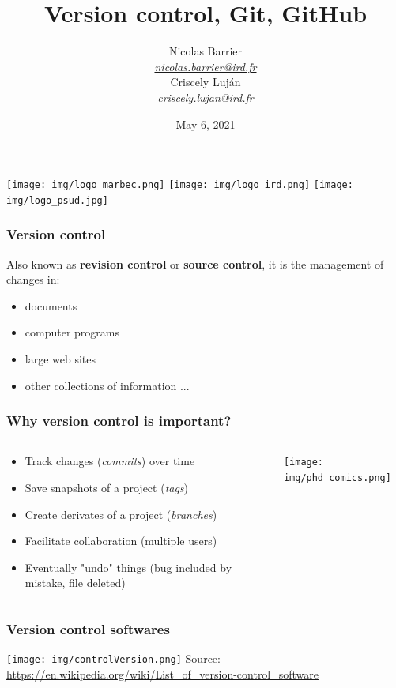 \documentclass[svgnames]{beamer}
\title[Version control, Git, GitHub]{Version control, Git, GitHub}
\author[Nicolas Barrier \& Criscely Luj\'{a}n]{
Nicolas Barrier\inst{1}\\
\tiny \emph{\href{mailto:nicolas.barrier@ird.fr}{nicolas.barrier@ird.fr}} \\
\normalsize
\vspace{1em} 
Criscely Luj\'{a}n\inst{1,2}\\
\tiny \emph{\href{mailto:criscely.lujan@ird.fr}{criscely.lujan@ird.fr}} \\
\normalsize
}
\institute[shortinst]{\inst{1} IRD, UMR-MARBEC \and \inst{2} Universit\'{e} Paris-Sud}
\date{May 6, 2021}
\begin{document}
\begin{frame}
    \titlepage 
    \begin{center}
        \texttt{[image: img/logo\_marbec.png]}
        \hspace{2em}
        \texttt{[image: img/logo\_ird.png]}
        \hspace{2em}
        \texttt{[image: img/logo\_psud.jpg]}
    \end{center}
\end{frame}

\begin{frame}
    \frametitle{Version control}

    Also known as \textbf{revision control} or \textbf{source control}, it is the management of changes in: \hfill

    \begin{itemize}
        \item documents
        \item computer programs
        \item large web sites
        \item other collections of information ...
    \end{itemize}
\end{frame}


\begin{frame}
    \frametitle{Why version control is important?}
    \begin{columns}[c]
    		\begin{column}{0.5\linewidth}
			\begin{itemize}
				\item Track changes (\emph{commits}) over time 
				\item Save snapshots of a project (\emph{tags})
				\item Create derivates of a project (\emph{branches})
				\item Facilitate collaboration (multiple users)
				\item Eventually "undo" things (bug included by mistake, file deleted)
			\end{itemize}
    		\end{column}
    		\begin{column}{0.5\linewidth}
        			\texttt{[image: img/phd\_comics.png]}
    		\end{column}
    \end{columns}
\end{frame}


\begin{frame}
\frametitle{Version control softwares}

\begin{center}
\texttt{[image: img/controlVersion.png]}
Source: \url{https://en.wikipedia.org/wiki/List_of_version-control_software}
\end{center}
\end{frame}
\end{document}
